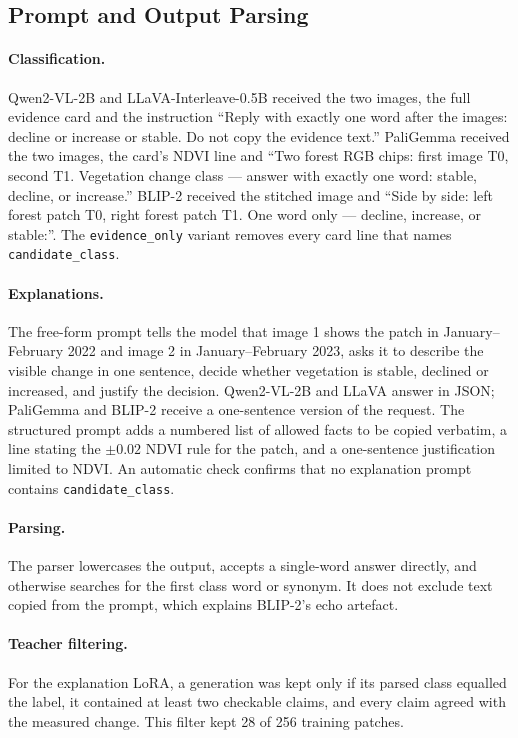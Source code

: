 \subsection{Prompt and Output Parsing}

\paragraph{Classification.} Qwen2-VL-2B and LLaVA-Interleave-0.5B
received the two images, the full evidence card and the instruction
``Reply with exactly one word after the images: decline or increase or
stable. Do not copy the evidence text.'' PaliGemma received the two
images, the card's NDVI line and ``Two forest RGB chips: first image T0,
second T1. Vegetation change class --- answer with exactly one word:
stable, decline, or increase.'' BLIP-2 received the stitched image and
``Side by side: left forest patch T0, right forest patch T1. One word
only --- decline, increase, or stable:''. The \texttt{evidence\_only}
variant removes every card line that names \texttt{candidate\_class}.

\paragraph{Explanations.} The free-form prompt tells the model that
image 1 shows the patch in January--February 2022 and image 2 in
January--February 2023, asks it to describe the visible change in one
sentence, decide whether vegetation is stable, declined or increased,
and justify the decision. Qwen2-VL-2B and LLaVA answer in JSON;
PaliGemma and BLIP-2 receive a one-sentence version of the request.
The structured prompt adds a numbered list of allowed facts to be copied verbatim, a line stating
the $\pm 0.02$ NDVI rule for the patch, and a one-sentence justification
limited to NDVI. An automatic check confirms that no explanation prompt
contains \texttt{candidate\_class}.

\paragraph{Parsing.} The parser lowercases the output, accepts a
single-word answer directly, and otherwise searches for the first class
word or synonym. It does not exclude text copied from the prompt, which
explains BLIP-2's echo artefact.

\paragraph{Teacher filtering.} For the explanation LoRA, a generation
was kept only if its parsed class equalled the label, it contained at
least two checkable claims, and every claim agreed with the measured
change. This filter kept 28 of 256 training patches.

